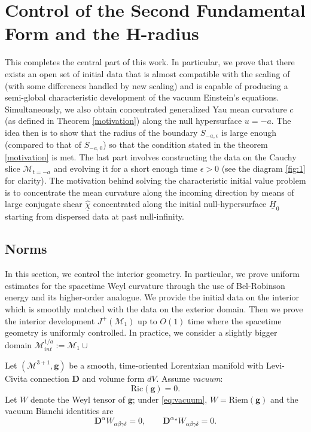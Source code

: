 \documentclass{amsart}
\newcommand{\Hbar}{\underline{H}}
\newcommand{\chibarhat}{\underline{\hat{\chi}}}
\begin{document}
{\section{Control of the Second Fundamental Form and the H-radius}
\label{radius_estimate}
\noindent This completes the central part of this work. In particular, we prove that there exists an open set of initial data that is almost compatible with the scaling of \cite{AnThesis} (with some differences handled by new scaling) and is capable of producing a semi-global characteristic development of the vacuum Einstein's equations. Simultaneously, we also obtain concentrated generalized Yau mean curvature $c$ (as defined in Theorem \ref{motivation}) along the null hypersurface $u=-a$. The idea then is to show that the radius of the boundary $S_{-a,\epsilon}$ is large enough (compared to that of $S_{-a,0}$) so that the condition stated in the theorem \ref{motivation} is met. The last part involves constructing the data on the Cauchy slice $\mathcal{M}_{t=-a}$ and evolving it for a short enough time $\epsilon>0$ (see the diagram \ref{fig:1} for clarity). The motivation behind solving the characteristic initial value problem is to concentrate the mean curvature along the incoming direction by means of large conjugate shear $\chibarhat$ concentrated along the initial null-hypersurface $\Hbar_{0}$ starting from dispersed data at past null-infinity.    

\subsection{Norms}
In this section, we control the interior geometry. In particular, we prove uniform estimates for the spacetime Weyl curvature through the use of Bel-Robinson energy and its higher-order analogue. We provide the initial data on the interior which is smoothly matched with the data on the exterior domain. Then we prove the interior development $J^{+}(\mathcal{M}_{1})$ up to $O(1)$ time where the spacetime geometry is uniformly controlled. In practice, we consider a slightly bigger domain $\mathcal{M}^{1/a}_{int}:=\mathcal{M}_{1}\cup $

\noindent Let $(\mathcal M^{3+1},\mathbf g)$ be a smooth, time-oriented Lorentzian manifold
with Levi-Civita connection $\mathbf D$ and volume form $dV$.
Assume \emph{vacuum}:
\begin{equation}\label{eq:vacuum}
\text{Ric}(\mathbf g)=0.
\end{equation}
Let $W$ denote the Weyl tensor of $\mathbf g$; under \eqref{eq:vacuum}, $W=\text{Riem}(\mathbf g)$ and
the vacuum Bianchi identities are
\begin{equation}\label{eq:bianchi}
\mathbf D^\alpha W_{\alpha\beta\gamma\delta}=0,
\qquad
\mathbf D^\alpha {}^\star W_{\alpha\beta\gamma\delta}=0.
\end{equation}

}
\end{document}
